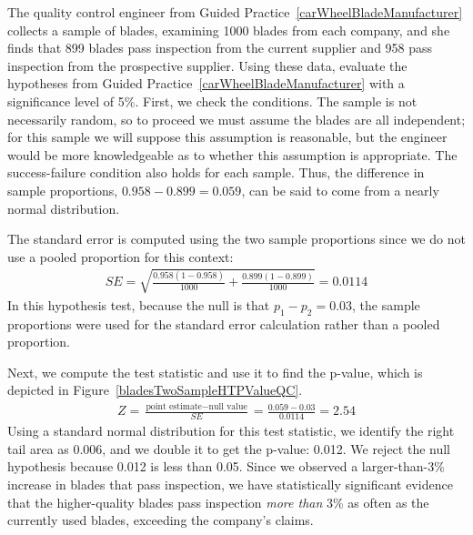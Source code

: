 \begin{examplewrap}
\begin{nexample}{The quality control engineer from
    Guided Practice~\ref{carWheelBladeManufacturer}
    collects a sample of blades, examining 1000 blades
    from each company, and she finds that 899 blades pass
    inspection from the current supplier and 958 pass
    inspection from the prospective supplier.
    Using these data, evaluate the hypotheses from
    Guided Practice~\ref{carWheelBladeManufacturer}
    with a significance level of 5\%.}
  \label{qualityCtrlEngHypothesisEval}%
  First, we check the conditions.
  The sample is not necessarily random, so to proceed
  we must assume the blades are all independent;
  for this sample we will suppose this assumption
  is reasonable, but the engineer would be more knowledgeable
  as to whether this assumption is appropriate.
  The success-failure condition also holds for each sample.
  Thus, the difference in sample proportions,
  $0.958 - 0.899 = 0.059$, can be said to come from a nearly
  normal distribution.

  The standard error is computed using the two sample
  proportions since we do not use a pooled proportion
  for this context:
  \begin{align*}
  SE
    = \sqrt{\frac{0.958(1-0.958)}{1000} +
        \frac{0.899(1-0.899)}{1000}}
    = 0.0114
  \end{align*}
  In this hypothesis test, because the null is that
  $p_1 - p_2 = 0.03$, the sample proportions were used
  for the standard error calculation rather than a pooled
  proportion.

  Next, we compute the test statistic and use it to find the
  p-value, which is depicted in
  Figure~\ref{bladesTwoSampleHTPValueQC}.
  \begin{align*}
  Z = \frac{\text{point estimate} - \text{null value}}{SE}
    = \frac{0.059 - 0.03}{0.0114} = 2.54
  \end{align*}
  Using a standard normal distribution for this test statistic,
  we identify the right tail area as 0.006,
  and we double it to get the p-value: 0.012.
  We reject the null hypothesis because 0.012 is less than 0.05.
  Since we observed a larger-than-3\% increase in blades
  that pass inspection, we have statistically significant
  evidence that the higher-quality blades pass inspection
  \emph{more than} 3\% as often as the currently used blades,
  exceeding the company's claims.
\end{nexample}
\end{examplewrap}

